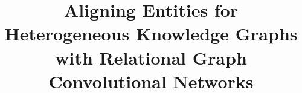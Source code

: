 


	\title{Aligning Entities for Heterogeneous Knowledge Graphs \\
		with Relational Graph Convolutional Networks}
	\author{
	}
	\maketitle
	













